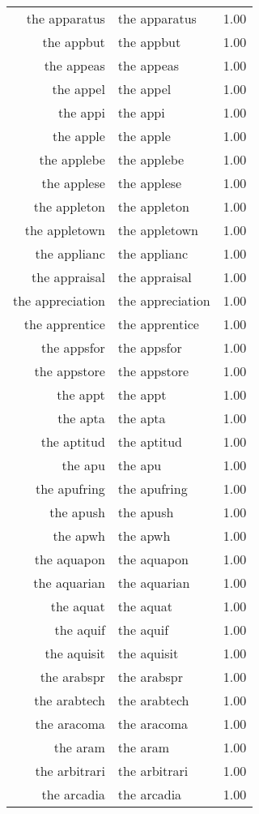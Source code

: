 \begin{table}[ht]
\begin{tabular}{rlr}
  the apparatus & the apparatus & 1.00 \\ 
  the appbut & the appbut & 1.00 \\ 
  the appeas & the appeas & 1.00 \\ 
  the appel & the appel & 1.00 \\ 
  the appi & the appi & 1.00 \\ 
  the apple & the apple & 1.00 \\ 
  the applebe & the applebe & 1.00 \\ 
  the applese & the applese & 1.00 \\ 
  the appleton & the appleton & 1.00 \\ 
  the appletown & the appletown & 1.00 \\ 
  the applianc & the applianc & 1.00 \\ 
  the appraisal & the appraisal & 1.00 \\ 
  the appreciation & the appreciation & 1.00 \\ 
  the apprentice & the apprentice & 1.00 \\ 
  the appsfor & the appsfor & 1.00 \\ 
  the appstore & the appstore & 1.00 \\ 
  the appt & the appt & 1.00 \\ 
  the apta & the apta & 1.00 \\ 
  the aptitud & the aptitud & 1.00 \\ 
  the apu & the apu & 1.00 \\ 
  the apufring & the apufring & 1.00 \\ 
  the apush & the apush & 1.00 \\ 
  the apwh & the apwh & 1.00 \\ 
  the aquapon & the aquapon & 1.00 \\ 
  the aquarian & the aquarian & 1.00 \\ 
  the aquat & the aquat & 1.00 \\ 
  the aquif & the aquif & 1.00 \\ 
  the aquisit & the aquisit & 1.00 \\ 
  the arabspr & the arabspr & 1.00 \\ 
  the arabtech & the arabtech & 1.00 \\ 
  the aracoma & the aracoma & 1.00 \\ 
  the aram & the aram & 1.00 \\ 
  the arbitrari & the arbitrari & 1.00 \\ 
  the arcadia & the arcadia & 1.00 \\ 

\end{tabular}
\end{table}
